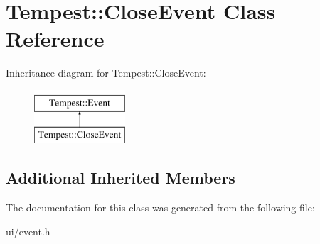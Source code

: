 \hypertarget{class_tempest_1_1_close_event}{\section{Tempest\+:\+:Close\+Event Class Reference}
\label{class_tempest_1_1_close_event}
}
Inheritance diagram for Tempest\+:\+:Close\+Event\+:\begin{figure}[H]
\begin{center}
\leavevmode
\includegraphics[height=2.000000cm]{class_tempest_1_1_close_event}
\end{center}
\end{figure}
\subsection*{Additional Inherited Members}


The documentation for this class was generated from the following file\+:\begin{DoxyCompactItemize}
\item 
ui/event.\+h\end{DoxyCompactItemize}
